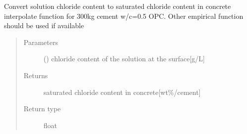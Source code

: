 \documentclass[letterpaper,10pt,english]{sphinxmanual}
\begin{document}
\begin{fulllineitems}
\label{\detokenize{chloride:chloride.C_eqv_to_C_S_0}}
\sphinxAtStartPar
Convert solution chloride content to saturated chloride content in concrete
interpolate function for 300kg cement w/c=0.5 OPC. Other empirical function should be used if available
\begin{quote}\begin{description}
\item[{Parameters}] \leavevmode
\sphinxAtStartPar
{} () \textendash{} chloride content of the solution at the surface{[}g/L{]}

\item[{Returns}] \leavevmode
\sphinxAtStartPar
saturated chloride content in concrete{[}wt\sphinxhyphen{}\%/cement{]}

\item[{Return type}] \leavevmode
\sphinxAtStartPar
float

\end{description}\end{quote}

\end{fulllineitems}

\end{document}
